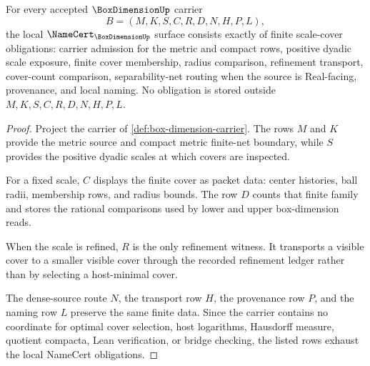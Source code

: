 \begin{theorem}
\label{thm:box-dimension-finite-cover-obligations}
For every accepted $\BoxDimensionUp$ carrier
$$
B=(M,K,S,C,R,D,N,H,P,L),
$$
the local $\NameCert_{\BoxDimensionUp}$ surface consists exactly of finite scale-cover obligations: carrier admission for the metric and compact rows, positive dyadic scale exposure, finite cover membership, radius comparison, refinement transport, cover-count comparison, separability-net routing when the source is Real-facing, provenance, and local naming. No obligation is stored outside $M,K,S,C,R,D,N,H,P,L$.
\end{theorem}
\begin{proof}
Project the carrier of \autoref{def:box-dimension-carrier}. The rows $M$ and $K$ provide the metric source and compact metric finite-net boundary, while $S$ provides the positive dyadic scales at which covers are inspected.

For a fixed scale, $C$ displays the finite cover as packet data: center histories, ball radii, membership rows, and radius bounds. The row $D$ counts that finite family and stores the rational comparisons used by lower and upper box-dimension reads.

When the scale is refined, $R$ is the only refinement witness. It transports a visible cover to a smaller visible cover through the recorded refinement ledger rather than by selecting a host-minimal cover.

The dense-source route $N$, the transport row $H$, the provenance row $P$, and the naming row $L$ preserve the same finite data. Since the carrier contains no coordinate for optimal cover selection, host logarithms, Hausdorff measure, quotient compacta, Lean verification, or bridge checking, the listed rows exhaust the local NameCert obligations.
\end{proof}

